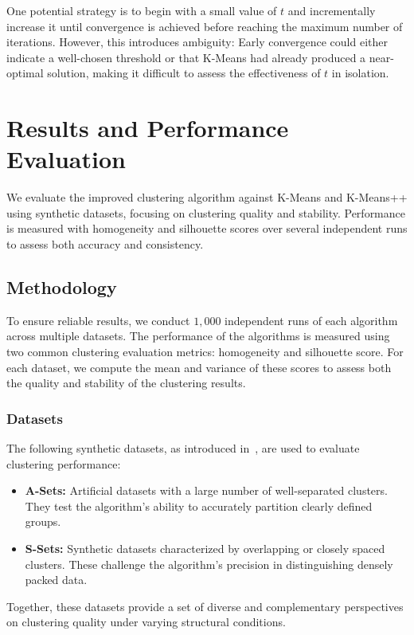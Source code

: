 \documentclass[10pt,twocolumn,letterpaper]{article}
\begin{document}
One potential strategy is to begin with a small value of $t$ and incrementally
increase it until convergence is achieved before reaching the maximum number of
iterations. However, this introduces ambiguity: Early convergence could either
indicate a well-chosen threshold or that K-Means had already produced a
near-optimal solution, making it difficult to assess the effectiveness of $t$
in isolation.


\section{Results and Performance Evaluation}\label{sec:results-and-performance-evaluation}

We evaluate the improved clustering algorithm against K-Means and K-Means++
using synthetic datasets, focusing on clustering quality and stability.
Performance is measured with homogeneity and silhouette scores over several
independent runs to assess both accuracy and consistency.


\subsection{Methodology}\label{subsec:methodology}

To ensure reliable results, we conduct $1,000$ independent runs of each
algorithm across multiple datasets. The performance of the algorithms is
measured using two common clustering evaluation metrics: homogeneity and
silhouette score. For each dataset, we compute the mean and variance of these
scores to assess both the quality and stability of the clustering results.

\subsubsection{Datasets}

The following synthetic datasets, as introduced in~\cite{ClusteringDatasets},
are used to evaluate clustering performance:

\begin{itemize}
    \item \textbf{A-Sets:} Artificial datasets with a large number of well-separated clusters. They test the algorithm’s ability to accurately partition clearly defined groups.
    \item \textbf{S-Sets:} Synthetic datasets characterized by overlapping or closely spaced clusters. These challenge the algorithm’s precision in distinguishing densely packed data.
\end{itemize}
Together, these datasets provide a set of
diverse and complementary perspectives on clustering
quality under varying structural conditions.
\end{document}
